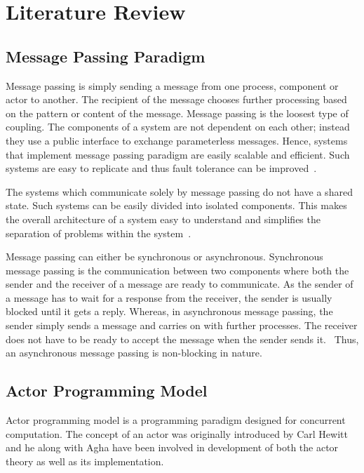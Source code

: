\chapter{Literature Review}\label{chapter:literature_review}

\section{Message Passing Paradigm}
\label{sec:messagePassing}
  Message passing is simply sending a message from one process, component or actor to another. The recipient of the message chooses further processing based on the pattern or content of the message.
  Message passing is the loosest type of coupling. The components of a system are not dependent on each other; instead they use a public interface to exchange parameterless messages\cite{joecelko}. Hence, systems that implement message passing paradigm are easily scalable and efficient. Such systems are easy to replicate and thus fault tolerance can be improved~\cite{Armstrong:2010:ERL:1810891.1810910}.

  The systems which communicate solely by message passing do not have a shared state. Such systems can be easily divided into isolated components. This makes the overall architecture of a system easy to understand and simplifies the separation of problems within the system~\cite{Armstrong:2010:ERL:1810891.1810910}.

  Message passing can either be synchronous or asynchronous. Synchronous message passing is the communication between two components where both the sender and the receiver of a message are ready to communicate. As the sender of a message has to wait for a response from the receiver, the sender is usually blocked until it gets a reply. Whereas, in asynchronous message passing, the sender simply sends a message and carries on with further processes. The receiver does not have to be ready to accept the message when the sender sends it.~\cite{agha} Thus, an asynchronous message passing is non-blocking in nature.

\section{Actor Programming Model}
\label{sec:actorProgramming}
  Actor programming model is a programming paradigm designed for concurrent computation. The concept of an actor was originally introduced by Carl Hewitt\cite{hewitt} and he along with Agha\cite{agha} have been involved in development of both the actor theory as well as its implementation.

